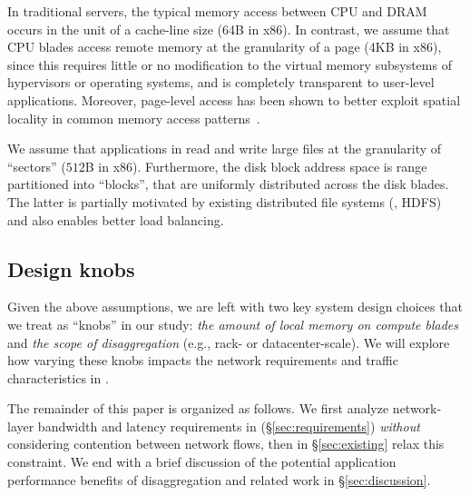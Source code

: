 In traditional servers, the typical memory access between CPU and DRAM occurs in the unit of a cache-line size (64B in x86). In contrast, we assume that CPU blades access remote memory at the granularity of a page (4KB in x86), since this requires little or no modification to the virtual memory subsystems of hypervisors or operating systems, and is completely transparent to user-level applications. Moreover, page-level access has been shown to better exploit spatial locality in common memory access patterns~\cite{ddcHwDesign1}. 


We assume that applications in \dis read and write large files at the granularity of ``sectors'' ($512$B in x86). Furthermore, the disk block address space is range partitioned into ``blocks'', that are uniformly distributed across the disk blades. The latter is partially motivated by existing distributed file systems (\eg, HDFS) and also enables better load balancing. %

\vspace{-0.1in}
\subsection{Design knobs}
\label{ssec:knobs}
\vspace{-0.05in}
Given the above assumptions, we are left with two key system design choices that we treat as ``knobs'' in our study: {\em the amount of local memory on compute blades} and  {\em the scope of disaggregation} (e.g., rack- or datacenter-scale). We will explore how varying these knobs impacts the network requirements and traffic characteristics in \dis. 

The remainder of this paper is organized as follows. We first analyze network-layer bandwidth and latency requirements in \dis(\S\ref{sec:requirements}) \emph{without} considering contention between network flows, then in \S\ref{sec:existing} relax this constraint. We end with a brief discussion of the potential application performance benefits of disaggregation and related work in \S\ref{sec:discussion}.